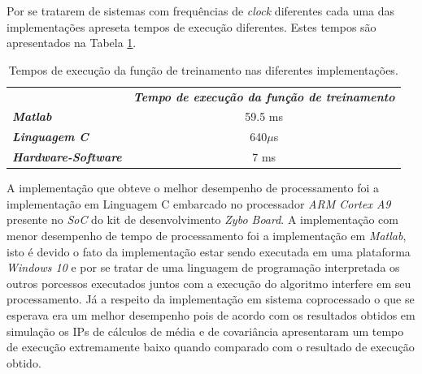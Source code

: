 Por se tratarem de sistemas com frequências de \textit{clock} diferentes cada uma das implementações apreseta tempos de execução diferentes. Estes tempos são apresentados na Tabela \ref{tempos}. 

\begin{table}[!h]
	\centering
	\caption{Tempos de execução da função de treinamento nas diferentes implementações.}
	\label{tempos}
	\begin{tabular}{lc}
		\rowcolor[HTML]{DAE8FC} 
		\multicolumn{1}{c}{\cellcolor[HTML]{DAE8FC}\textbf{Implementação}} & \textit{\textbf{Tempo de execução da função de treinamento}} \\
		\textit{\textbf{Matlab}}                                           & 59.5 ms                                                     \\
		\rowcolor[HTML]{DAE8FC} 
		\textit{\textbf{Linguagem C}}                                      & 640$\mu$s                                                 \\
		\textit{\textbf{Hardware-Software}}                                & 7 ms                                                       
	\end{tabular}
\end{table}

A implementação que obteve o melhor desempenho de processamento foi a implementação em Linguagem C embarcado no processador \textit{ARM Cortex A9} presente no \textit{SoC} do kit de desenvolvimento \textit{Zybo Board}. A implementação com menor desempenho de tempo de processamento foi a implementação em \textit{Matlab}, isto é devido o fato da implementação estar sendo executada em uma plataforma \textit{Windows 10} e por se tratar de uma linguagem de programação interpretada os outros porcessos executados juntos com a execução do algoritmo interfere em seu processamento. Já a respeito da implementação em sistema coprocessado o que se esperava era um melhor desempenho pois de acordo com os resultados obtidos em simulação os IPs de cálculos de média e de covariância apresentaram um tempo de execução extremamente baixo quando comparado com o resultado de execução obtido.
